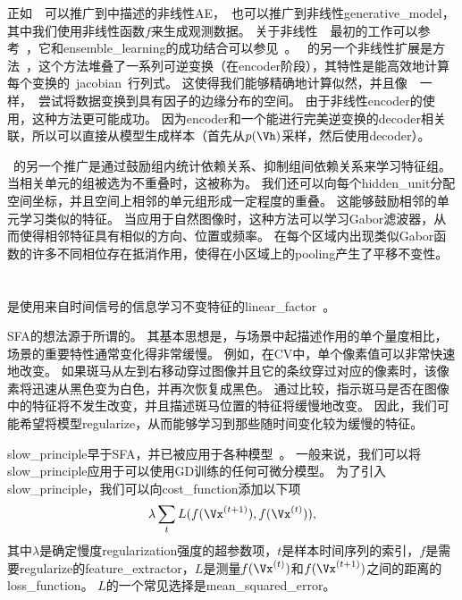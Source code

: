 正如~~可以推广到中描述的非线性\gls{AE}，~也可以推广到非线性\gls{generative_model}，其中我们使用非线性函数$f$来生成观测数据。
关于非线性~~最初的工作可以参考~\citet{hyvarinen1999nonlinear}，它和\gls{ensemble_learning}的成功结合可以参见~\citet{roberts2001independent,lappalainen2000nonlinear}。
~的另一个非线性扩展是方法~\citep{Dinh-et-al-arxiv2014}，这个方法堆叠了一系列可逆变换（在\gls{encoder}阶段），其特性是能高效地计算每个变换的~\gls{jacobian}~行列式。
这使得我们能够精确地计算似然，并且像~~一样，~尝试将数据变换到具有因子的边缘分布的空间。
由于非线性\gls{encoder}的使用，这种方法更可能成功。%
因为\gls{encoder}和一个能进行完美逆变换的\gls{decoder}相关联，所以可以直接从模型生成样本（首先从$p(\Vh)$采样，然后使用\gls{decoder}）。


~的另一个推广是通过鼓励组内统计依赖关系、抑制组间依赖关系来学习特征组。
当相关单元的组被选为不重叠时，这被称为。
我们还可以向每个\gls{hidden_unit}分配空间坐标，并且空间上相邻的单元组形成一定程度的重叠。
这能够鼓励相邻的单元学习类似的特征。
当应用于自然图像时，这种方法可以学习Gabor滤波器，从而使得相邻特征具有相似的方向、位置或频率。
在每个区域内出现类似Gabor函数的许多不同相位存在抵消作用，使得在小区域上的\gls{pooling}产生了平移不变性。


\section{}
\label{sec:slow_feature_analysis}


是使用来自时间信号的信息学习不变特征的\gls{linear_factor}~\citep{WisSej2002}。


\gls{SFA}的想法源于所谓的。
其基本思想是，与场景中起描述作用的单个量度相比，场景的重要特性通常变化得非常缓慢。
例如，在\gls{CV}中，单个像素值可以非常快速地改变。
如果斑马从左到右移动穿过图像并且它的条纹穿过对应的像素时，该像素将迅速从黑色变为白色，并再次恢复成黑色。
通过比较，指示斑马是否在图像中的特征将不发生改变，并且描述斑马位置的特征将缓慢地改变。
因此，我们可能希望将模型\gls{regularize}，从而能够学习到那些随时间变化较为缓慢的特征。


\gls{slow_principle}早于\gls{SFA}，并已被应用于各种模型~\citep{Hinton89b,Foldiak89,MobahiCollobertWestonICML2009,Bergstra+Bengio-2009}。
一般来说，我们可以将\gls{slow_principle}应用于可以使用\gls{GD}训练的任何可微分模型。 
为了引入\gls{slow_principle}，我们可以向\gls{cost_function}添加以下项
\begin{align}
\label{eqn:137}
\lambda \sum_t L(f(\Vx^{(t+1)}),f(\Vx^{(t)})),
\end{align}
其中$\lambda$是确定慢度\gls{regularization}强度的超参数项，$t$是样本时间序列的索引，$f$是需要\gls{regularize}的\gls{feature_extractor}，$L$是测量$f(\Vx^{(t)})$和$f(\Vx^{(t+1)})$之间的距离的\gls{loss_function}。
$L$的一个常见选择是\gls{mean_squared_error}。


